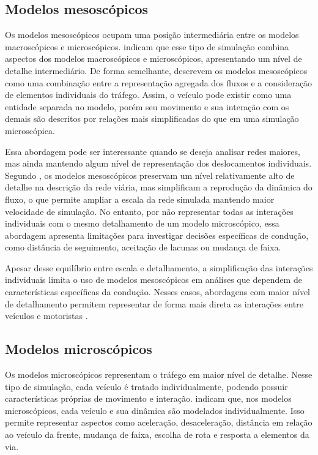 \subsection{Modelos mesoscópicos}

Os modelos mesoscópicos ocupam uma posição intermediária entre os modelos macroscópicos e microscópicos.  indicam que esse tipo de simulação combina aspectos dos modelos macroscópicos e microscópicos, apresentando um nível de detalhe intermediário. De forma semelhante,  descrevem os modelos mesoscópicos como uma combinação entre a representação agregada dos fluxos e a consideração de elementos individuais do tráfego. Assim, o veículo pode existir como uma entidade separada no modelo, porém seu movimento e sua interação com os demais são descritos por relações mais simplificadas do que em uma simulação microscópica.

Essa abordagem pode ser interessante quando se deseja analisar redes maiores, mas ainda mantendo algum nível de representação dos deslocamentos individuais. Segundo , os modelos mesoscópicos preservam um nível relativamente alto de detalhe na descrição da rede viária, mas simplificam a reprodução da dinâmica do fluxo, o que permite ampliar a escala da rede simulada mantendo maior velocidade de simulação. No entanto, por não representar todas as interações individuais com o mesmo detalhamento de um modelo microscópico, essa abordagem apresenta limitações para investigar decisões específicas de condução, como distância de seguimento, aceitação de lacunas ou mudança de faixa.

Apesar desse equilíbrio entre escala e detalhamento, a simplificação das interações individuais limita o uso de modelos mesoscópicos em análises que dependem de características específicas da condução. Nesses casos, abordagens com maior nível de detalhamento permitem representar de forma mais direta as interações entre veículos e motoristas \cite{dorokhin_2020}.

\subsection{Modelos microscópicos}

Os modelos microscópicos representam o tráfego em maior nível de detalhe. Nesse tipo de simulação, cada veículo é tratado individualmente, podendo possuir características próprias de movimento e interação.  indicam que, nos modelos microscópicos, cada veículo e sua dinâmica são modelados individualmente. Isso permite representar aspectos como aceleração, desaceleração, distância em relação ao veículo da frente, mudança de faixa, escolha de rota e resposta a elementos da via.


